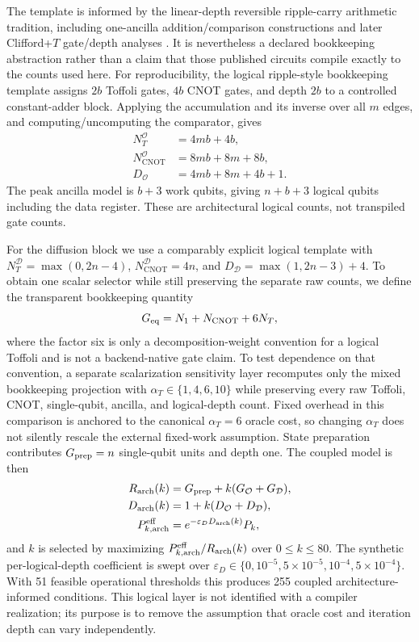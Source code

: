 \documentclass[5p,times]{elsarticle}
\begin{document}
The template is informed by the linear-depth reversible ripple-carry arithmetic tradition, including one-ancilla addition/comparison constructions and later Clifford+$T$ gate/depth analyses \cite{cuccaro2004,remaud2024}. It is nevertheless a declared bookkeeping abstraction rather than a claim that those published circuits compile exactly to the counts used here. For reproducibility, the logical ripple-style bookkeeping template assigns $2b$ Toffoli gates, $4b$ CNOT gates, and depth $2b$ to a controlled constant-adder block. Applying the accumulation and its inverse over all $m$ edges, and computing/uncomputing the comparator, gives
\begin{align}
N_T^{\mathcal O} &= 4mb+4b,\\
N_{\mathrm{CNOT}}^{\mathcal O} &= 8mb+8m+8b,\\
D_{\mathcal O} &= 4mb+8m+4b+1.
\end{align}
The peak ancilla model is $b+3$ work qubits, giving $n+b+3$ logical qubits including the data register. These are architectural logical counts, not transpiled gate counts.

For the diffusion block we use a comparably explicit logical template with $N_T^{\mathcal D}=\max(0,2n-4)$, $N_{\mathrm{CNOT}}^{\mathcal D}=4n$, and $D_{\mathcal D}=\max(1,2n-3)+4$. To obtain one scalar selector while still preserving the separate raw counts, we define the transparent bookkeeping quantity
\begin{equation}
G_{\rm eq}=N_1+N_{\mathrm{CNOT}}+6N_T,
\end{equation}
where the factor six is only a decomposition-weight convention for a logical Toffoli and is not a backend-native gate claim. To test dependence on that convention, a separate scalarization sensitivity layer recomputes only the mixed bookkeeping projection with $\alpha_T\in\{1,4,6,10\}$ while preserving every raw Toffoli, CNOT, single-qubit, ancilla, and logical-depth count. Fixed overhead in this comparison is anchored to the canonical $\alpha_T=6$ oracle cost, so changing $\alpha_T$ does not silently rescale the external fixed-work assumption. State preparation contributes $G_{\rm prep}=n$ single-qubit units and depth one. The coupled model is then
\begin{align}
R_{\rm arch}(k)&=G_{\rm prep}+k(G_{\mathcal O}+G_{\mathcal D}),\\
D_{\rm arch}(k)&=1+k(D_{\mathcal O}+D_{\mathcal D}),\\
P_{k,\rm arch}^{\rm eff}&=e^{-\varepsilon_D D_{\rm arch}(k)}P_k,
\end{align}
and $k$ is selected by maximizing $P_{k,\rm arch}^{\rm eff}/R_{\rm arch}(k)$ over $0\leq k\leq80$. The synthetic per-logical-depth coefficient is swept over $\varepsilon_D\in\{0,10^{-5},5\times10^{-5},10^{-4},5\times10^{-4}\}$. With 51 feasible operational thresholds this produces 255 coupled architecture-informed conditions. This logical layer is not identified with a compiler realization; its purpose is to remove the assumption that oracle cost and iteration depth can vary independently.
\end{document}
